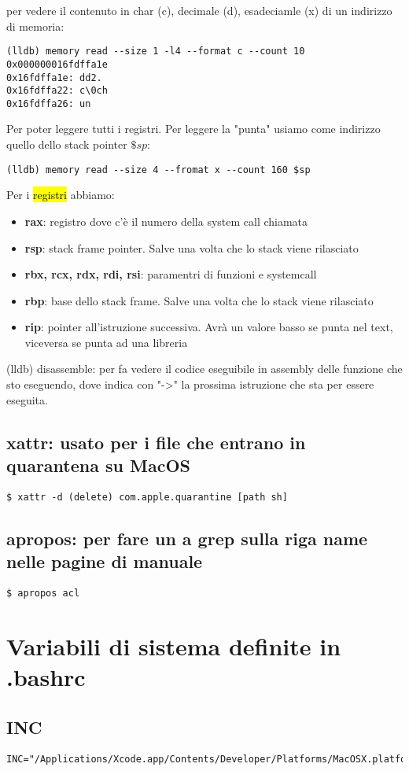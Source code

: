 per vedere il contenuto in char (c), decimale (d), esadeciamle (x) di un indirizzo di memoria:
\begin{lstlisting}
(lldb) memory read --size 1 -l4 --format c --count 10 0x000000016fdffa1e
0x16fdffa1e: dd2.
0x16fdffa22: c\0ch
0x16fdffa26: un
\end{lstlisting}

Per poter leggere tutti i registri. Per leggere la "punta" usiamo come indirizzo quello dello stack pointer $\$sp$:

\begin{lstlisting}
(lldb) memory read --size 4 --fromat x --count 160 $sp
\end{lstlisting}

Per i \hl{registri} abbiamo:

\begin{itemize}
        \item \textbf{rax}: registro dove c'è il numero della system call chiamata
        \item \textbf{rsp}: stack frame pointer. Salve una volta che lo stack viene rilasciato
        \item \textbf{rbx, rcx, rdx, rdi, rsi}: paramentri di funzioni e systemcall
        \item \textbf{rbp}: base dello stack frame. Salve una volta che lo stack viene rilasciato
        \item \textbf{rip}: pointer all'istruzione successiva. Avrà un valore basso se punta nel text, viceversa se punta ad una libreria
\end{itemize}


(lldb) disassemble: per fa vedere il codice eseguibile in assembly delle funzione che sto eseguendo, dove indica con "->" la prossima istruzione che sta per essere eseguita.


\subsection{xattr: usato per i file che entrano in quarantena su MacOS}

\begin{lstlisting}
$ xattr -d (delete) com.apple.quarantine [path sh]
\end{lstlisting}


\subsection{apropos: per fare un a grep sulla riga name nelle pagine di manuale}

\begin{lstlisting}
$ apropos acl
\end{lstlisting}



\section{Variabili di sistema definite in .bashrc}

\subsection{INC}

\begin{lstlisting}
INC="/Applications/Xcode.app/Contents/Developer/Platforms/MacOSX.platform/Developer/SDKs/MacOSX.sdk/usr/include/"
\end{lstlisting}

